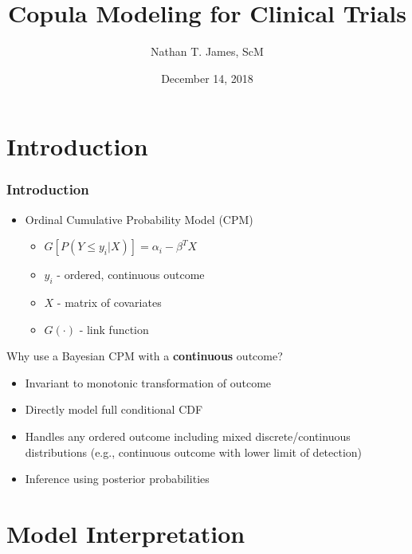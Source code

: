 \documentclass{beamer}
\title[Copula Modeling for Clinical Trials]{Copula Modeling for Clinical Trials}
\author{Nathan T. James, ScM}
\institute{Dept. of Biostatistics, Vanderbilt University}
\date{December 14, 2018}
\begin{document}
	
	\frame{\titlepage}	
	
\section{Introduction}

	\begin{frame}
		\frametitle{Introduction}
		\begin{itemize}
			\item Ordinal Cumulative Probability Model (CPM)
	           \begin{itemize}
		           	\item $G[P(Y \le y_i|X)]=\alpha_i-\beta^{T}X$ 
	           		\item $y_i$ - ordered, continuous outcome
	           		\item $X$ - matrix of covariates
	           		\item $G(\cdot)$ - link function 
	           \end{itemize}
	     \end{itemize}
	     Why use a Bayesian CPM with a \textbf{continuous} outcome?
	     \begin{itemize}
	        \item Invariant to monotonic transformation of outcome 
	        \item Directly model full conditional CDF 
           	\item Handles any ordered outcome including mixed discrete/continuous distributions (e.g., continuous outcome with lower limit of detection) 
           	\item Inference using posterior probabilities   	
		\end{itemize}
	\end{frame}
	
\section{Model Interpretation}
	
\end{document}
